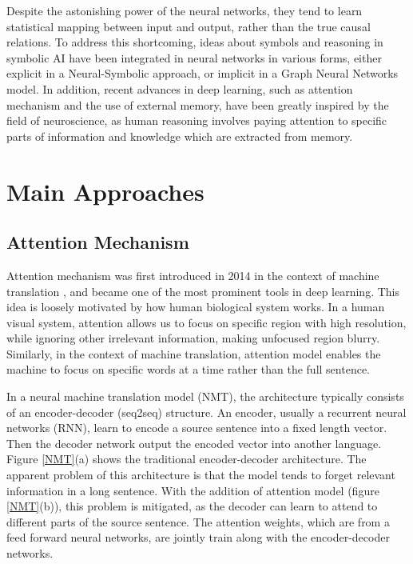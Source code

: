\documentclass[journal]{IEEEtran}
\begin{document}
Despite the astonishing power of the neural networks, they tend to learn statistical mapping between input and output, rather than the true causal relations. 
To address this shortcoming, ideas about symbols and reasoning in symbolic AI have been integrated in neural networks in various forms, 
either explicit in a Neural-Symbolic approach, or implicit in a Graph Neural Networks model.
In addition, recent advances in deep learning, such as attention mechanism and the use of external memory, have been greatly inspired by the field of neuroscience, as 
human reasoning involves paying attention to specific parts of information and knowledge which are extracted from memory.

\section{Main Approaches}
\subsection{Attention Mechanism}
Attention mechanism was first introduced in 2014 in the context of machine translation \cite{bahdanau2014neural}, 
and became one of the most prominent tools in deep learning. 
This idea is loosely motivated by how human biological system works. 
In a human visual system, attention allows us to focus on specific region with high resolution, 
while ignoring other irrelevant information, making unfocused region blurry.
Similarly, in the context of machine translation, attention model enables the machine to focus on specific words at a time 
rather than the full sentence.

In a neural machine translation model (NMT), the architecture typically consists of an encoder-decoder (seq2seq) structure.
An encoder, usually a recurrent neural networks (RNN), learn to encode a source sentence into a fixed length vector.
Then the decoder network output the encoded vector into another language. Figure \ref{NMT}(a) shows the traditional encoder-decoder architecture.
The apparent problem of this architecture is that the model tends to forget relevant information in a long sentence.
With the addition of attention model (figure \ref{NMT}(b)), this problem is mitigated, 
as the decoder can learn to attend to different parts of the source sentence. 
The attention weights, which are from a feed forward neural networks, are jointly train along with the encoder-decoder networks.
\end{document}
